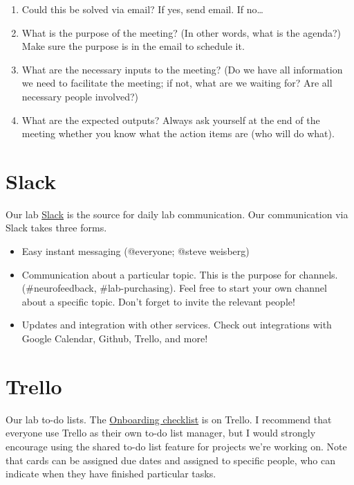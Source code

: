 \documentclass[
  12pt,
]{book}
\begin{document}
\begin{enumerate}
\def\labelenumi{\arabic{enumi}.}
\item
  Could this be solved via email?
  If yes, send email. If no\ldots{}
\item
  What is the purpose of the meeting? (In other words, what is the agenda?) Make sure the purpose is in the email to schedule it.
\item
  What are the necessary inputs to the meeting? (Do we have all information we need to facilitate the meeting; if not, what are we waiting for? Are all necessary people involved?)
\item
  What are the expected outputs? Always ask yourself at the end of the meeting whether you know what the action items are (who will do what).
\end{enumerate}

\hypertarget{slack}{%
\section{Slack}\label{slack}}

Our lab \href{scannlab.slack.com}{Slack} is the source for daily lab communication. Our communication via Slack takes three forms.

\begin{itemize}
\item
  Easy instant messaging (@everyone; @steve weisberg)
\item
  Communication about a particular topic. This is the purpose for channels. (\#neurofeedback, \#lab-purchasing). Feel free to start your own channel about a specific topic. Don't forget to invite the relevant people!
\item
  Updates and integration with other services. Check out integrations with Google Calendar, Github, Trello, and more!
\end{itemize}

\hypertarget{trello}{%
\section{Trello}\label{trello}}

Our lab to-do lists. The \protect\hyperlink{onboarding}{Onboarding checklist} is on Trello. I recommend that everyone use Trello as their own to-do list manager, but I would strongly encourage using the shared to-do list feature for projects we're working on. Note that cards can be assigned due dates and assigned to specific people, who can indicate when they have finished particular tasks.
\end{document}
